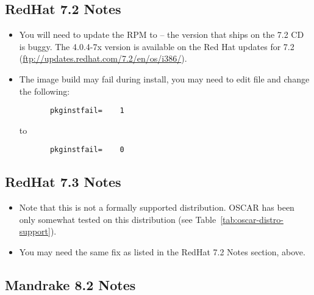 \subsection{RedHat 7.2 Notes}
\label{subsec:rh72notes}
\begin{itemize}
\item You will need to update the  RPM to
   -- the version that ships on the 7.2 CD is
  buggy.  The 4.0.4-7x version is available on the Red Hat updates for
  7.2 (\url{ftp://updates.redhat.com/7.2/en/os/i386/}).
  
\item The image build may fail during install, you may need to edit
  file  and change
  the following:

\begin{verbatim}
       pkginstfail=    1
\end{verbatim}

  to

\begin{verbatim}
       pkginstfail=    0
\end{verbatim}
\end{itemize}


\subsection{RedHat 7.3 Notes}
\label{subsec:rh73notes}

\begin{itemize}
\item Note that this is not a formally supported distribution.  OSCAR
  \oscarversion has been only somewhat tested on this distribution
  (see Table~\ref{tab:oscar-distro-support}).

\item You may need the same  fix as listed
  in the RedHat 7.2 Notes section, above.
\end{itemize}


\subsection{Mandrake 8.2 Notes}
\label{subsec:mdk82notes}

